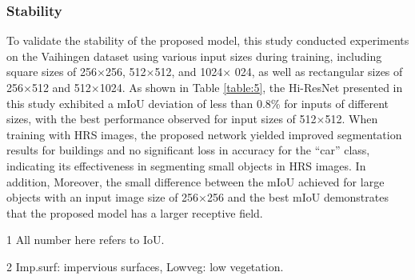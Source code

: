 \documentclass[journal]{IEEEtran}
\begin{document}
\subsubsection{Stability} 
To validate the stability of the proposed model, this study conducted experiments on the Vaihingen dataset using various input sizes during training, including square sizes of 256$\times$256, 512$\times$512, and 1024$\times$ 024, as well as rectangular sizes of 256$\times$512 and 512$\times$1024. As shown in Table \ref{table:5}, the Hi-ResNet presented in this study exhibited a mIoU deviation of less than 0.8\% for inputs of different sizes, with the best performance observed for input sizes of 512$\times$512. When training with HRS images, the proposed network yielded improved segmentation results for buildings and no significant loss in accuracy for the ``car'' class, indicating its effectiveness in segmenting small objects in HRS images. In addition, Moreover, the small difference between the mIoU achieved for large objects with an input image size of 256$\times$256 and the best mIoU demonstrates that the proposed model has a larger receptive field.


\begin{table}[!ht]
  \begin{center}
  \begin{threeparttable}
        \begin{tablenotes}
        \footnotesize  
        \item[1] All number here refers to IoU.
        \item[2] Imp.surf: impervious surfaces, Lowveg: low vegetation.
        
      \end{tablenotes} 
      \end{threeparttable}
  \end{center}
  \label{table:5}
\end{table}
\end{document}
